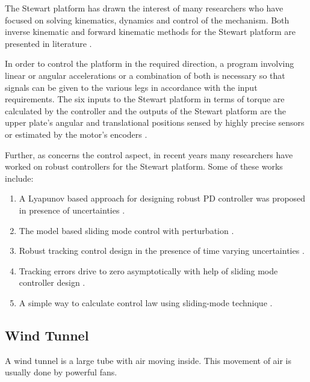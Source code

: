 The Stewart platform has drawn the interest of many researchers who have focused on solving kinematics, dynamics and control of the mechanism. Both inverse kinematic and forward kinematic methods for the Stewart platform are presented in literature
\cite{csumnu2017simulation}.

In order to control the platform in the required direction, a program involving linear or angular accelerations or a combination of both is necessary so that signals can be given to the various legs in accordance with the input requirements. The six inputs to the Stewart platform in terms of torque are calculated by the controller and the outputs of the Stewart platform are the upper plate's angular and translational positions sensed by highly precise sensors or estimated by the motor's encoders \cite{iqbal_dynamic_2008}.

Further, as concerns the control aspect, in recent years many researchers have worked on robust controllers for the Stewart platform. Some of these works include:
\begin{enumerate}
\item A Lyapunov based approach for designing robust PD controller was proposed in presence of uncertainties 
\cite{kang1996robust}.
\item The model based sliding mode control with perturbation 
\cite{kang1996robust}.
\item Robust tracking control design in the presence of time varying
uncertainties 
\cite{kim1998high}.
\item Tracking errors drive to zero asymptotically with help of sliding mode
controller design 
\cite{huang2004sliding}.
\item A simple way to calculate control law using sliding-mode technique 
\cite{iqbal2006direct}.
\end{enumerate}

\subsection{Wind Tunnel}
A wind tunnel is a large tube with air moving inside. This movement of air is usually done by powerful fans. 

